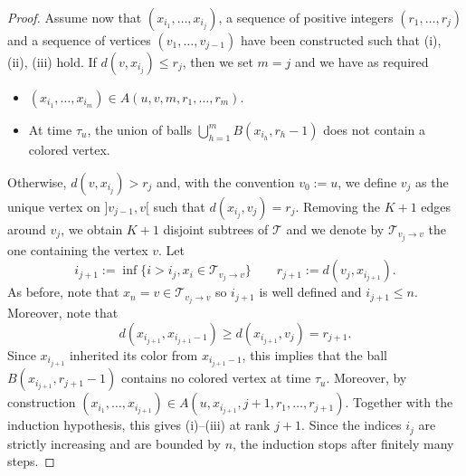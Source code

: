 \documentclass[french]{article}
\newcommand{\T}{\mathcal{T}}
\renewcommand{\1}{\mathds{1}}
\begin{document}
\begin{proof}
Assume now that $(x_{i_1},\ldots, x_{i_j})$, a sequence of positive integers $(r_1,\ldots,r_j)$ and a sequence of vertices $(v_1,\ldots, v_{j-1})$ have been constructed such that (i), (ii), (iii) hold. 
If $d(v,x_{i_j})\le r_j$, then we set $m=j$ and we have as required
\begin{itemize}
    \item $(x_{i_1},\ldots, x_{i_m})\in A(u,v,m,r_1,\ldots,r_m)$.
    \item At time $\tau_u$, the union of balls $\bigcup_{h=1}^m B(x_{i_h},r_h-1)$ does not contain a colored vertex.
\end{itemize}
Otherwise, $d(v,x_{i_j})> r_j$ and, with the convention $v_0:=u$, we define $v_j$ as the unique vertex on $]v_{j-1},v[$ such that $d(x_{i_j},v_j)=r_j$. Removing the $K+1$ edges around $v_j$, we obtain $K+1$ disjoint subtrees of $\T$ and we denote by $\T_{v_j\to v}$ the one containing the vertex $v$. 
Let 
$$i_{j+1}:=\inf\{i> i_j, x_i\in \T_{v_j\to v}\} \qquad r_{j+1}:=d(v_j,x_{i_{j+1}}).$$
As before, note that $x_n=v\in \T_{v_j\to v}$ so $i_{j+1}$ is well defined and $i_{j+1}\le n$. Moreover, note that 
$$d(x_{i_{j+1}},x_{i_{j+1}-1}) \ge d(x_{i_{j+1}},v_j)=r_{j+1}.$$
Since $x_{i_{j+1}}$ inherited its color from $x_{i_{j+1}-1}$, this implies that the ball $B(x_{i_{j+1}},r_{j+1}-1)$ contains no colored vertex at time $\tau_u$. Moreover, by construction
$(x_{i_1},\ldots, x_{i_{j+1}})\in A(u,x_{i_{j+1}},j+1,r_1,\ldots,r_{j+1})$.
Together with the induction hypothesis, this gives (i)--(iii) at rank $j+1$. Since the indices \(i_j\) are strictly increasing and are bounded by \(n\), the induction stops after finitely many steps.
\end{proof}
\end{document}
